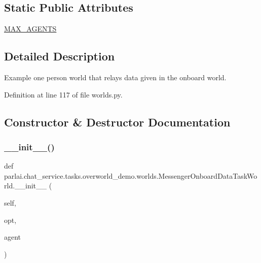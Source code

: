 \subsection*{Static Public Attributes}
\begin{DoxyCompactItemize}
\item 
\hyperlink{classparlai_1_1chat__service_1_1tasks_1_1overworld__demo_1_1worlds_1_1MessengerOnboardDataTaskWorld_aa44a384d8f4c54ab0a5e8db9df063e34}{M\+A\+X\+\_\+\+A\+G\+E\+N\+TS}
\end{DoxyCompactItemize}


\subsection{Detailed Description}
\begin{DoxyVerb}Example one person world that relays data given in the onboard world.
\end{DoxyVerb}
 

Definition at line 117 of file worlds.\+py.



\subsection{Constructor \& Destructor Documentation}
\mbox{\label{classparlai_1_1chat__service_1_1tasks_1_1overworld__demo_1_1worlds_1_1MessengerOnboardDataTaskWorld_a2a6af8dfc01b563104a8ec6af83711bc}} 
\subsubsection{\texorpdfstring{\+\_\+\+\_\+init\+\_\+\+\_\+()}{\_\_init\_\_()}}
{\footnotesize\ttfamily def parlai.\+chat\+\_\+service.\+tasks.\+overworld\+\_\+demo.\+worlds.\+Messenger\+Onboard\+Data\+Task\+World.\+\_\+\+\_\+init\+\_\+\+\_\+ (\begin{DoxyParamCaption}\item[{}]{self,  }\item[{}]{opt,  }\item[{}]{agent }\end{DoxyParamCaption})}



